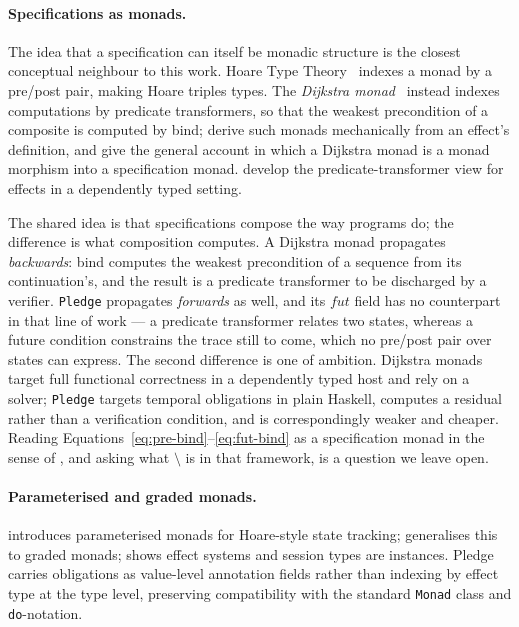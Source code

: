 \documentclass[acmsmall,screen]{acmart}
\newcommand{\fut}{\mathit{fut}}
\newcommand{\lquot}{\mathbin{\setminus}}   %
\begin{document}
\paragraph{Specifications as monads.}
The idea that a specification can itself be monadic structure is the
closest conceptual neighbour to this work.
Hoare Type Theory~\cite{nanevski2008htt} indexes a monad by a pre/post
pair, making Hoare triples types.
The \emph{Dijkstra monad}~\cite{swamy2013dijkstra} instead indexes
computations by predicate transformers, so that the weakest precondition of
a composite is computed by bind;
\citet{ahman2017dijkstra} derive such monads mechanically from an effect's
definition, and \citet{maillard2019dijkstra} give the general account in
which a Dijkstra monad is a monad morphism into a specification monad.
\citet{swierstra2019} develop the predicate-transformer view for effects in
a dependently typed setting.

The shared idea is that specifications compose the way programs do; the
difference is what composition computes.
A Dijkstra monad propagates \emph{backwards}: bind computes the weakest
precondition of a sequence from its continuation's, and the result is a
predicate transformer to be discharged by a verifier.
\lstinline{Pledge} propagates \emph{forwards} as well, and its $\fut$ field
has no counterpart in that line of work --- a predicate transformer relates
two states, whereas a future condition constrains the trace still to come,
which no pre/post pair over states can express.
The second difference is one of ambition.
Dijkstra monads target full functional correctness in a dependently typed
host and rely on a solver; \lstinline{Pledge} targets temporal obligations
in plain Haskell, computes a residual rather than a verification condition,
and is correspondingly weaker and cheaper.
Reading Equations~\eqref{eq:pre-bind}--\eqref{eq:fut-bind} as a
specification monad in the sense of \citet{maillard2019dijkstra}, and asking
what $\lquot$ is in that framework, is a question we leave open.

\paragraph{Parameterised and graded monads.}
\citet{atkey2009} introduces parameterised monads for Hoare-style state
tracking; \citet{katsumata2014} generalises this to graded monads;
\citet{orchard2016} shows effect systems and session types are instances.
Pledge carries obligations as value-level annotation fields rather than
indexing by effect type at the type level, preserving compatibility with the
standard \lstinline{Monad} class and \lstinline{do}-notation.
\end{document}
